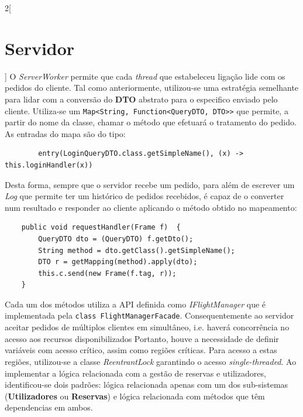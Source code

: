 \documentclass[a4paper,11pt]{article}
\begin{document}
\begin{multicols}{2}[\section{Servidor}]
    O \textit{ServerWorker} permite que cada \textit{thread} que estabeleceu ligação
    lide com os pedidos do cliente.
    Tal como anteriormente, utilizou-se uma estratégia semelhante para lidar com a conversão
    do \textbf{DTO} abstrato para o especifico enviado pelo cliente.
    Utiliza-se um \texttt{Map<String, Function<QueryDTO, DTO>>} que permite,
    a partir do nome da classe, chamar o método que efetuará o tratamento do pedido.
    As entradas do mapa são do tipo:
    \begin{verbatim}
        entry(LoginQueryDTO.class.getSimpleName(), (x) -> this.loginHandler(x))
    \end{verbatim}
    Desta forma, sempre que o servidor recebe um pedido, para além de escrever um
    \textit{Log} que permite ter um histórico de pedidos recebidos, é capaz de o converter
    num resultado e responder ao cliente aplicando o método obtido no mapeamento:
    \begin{verbatim}
	public void requestHandler(Frame f)  {
		QueryDTO dto = (QueryDTO) f.getDto();
		String method = dto.getClass().getSimpleName();
		DTO r = getMapping(method).apply(dto);
		this.c.send(new Frame(f.tag, r));
	}
    \end{verbatim}
    Cada um dos métodos utiliza a API definida como \textit{IFlightManager}
    que é implementada pela \texttt{class FlightManagerFacade}.
    Consequentemente ao servidor aceitar pedidos de múltiplos clientes em simultâneo,
    i.e. haverá concorrência no acesso aos recursos disponibilizados
    Portanto, houve a necessidade de definir variáveis com acesso crítico, assim
    como regiões críticas.
    Para acesso a estas regiões, utilizou-se a classe \textit{ReentrantLock} garantindo
    o acesso \textit{single-threaded}.
    Ao implementar a lógica relacionada com a gestão de reservas e utilizadores,
    identificou-se dois padrões: lógica relacionada apenas com um dos sub-sistemas
    (\textbf{Utilizadores} ou \textbf{Reservas}) e lógica relacionada com métodos
    que têm dependencias em ambos.
    

\end{multicols}
\end{document}
